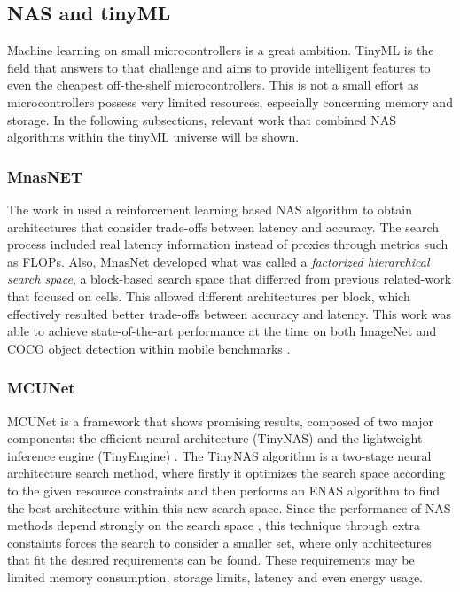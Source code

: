 \documentclass[10pt,        %
               a4paper,     %
               journal,     %
               ]{IEEEtran}
\begin{document}
\subsection{NAS and tinyML}
\label{nasml}
Machine learning on small microcontrollers is a great ambition. TinyML is the field that answers to that challenge
and aims to provide intelligent features to even the cheapest off-the-shelf microcontrollers. This is not a
small effort as microcontrollers possess very limited resources, especially concerning memory and storage. In the following
subsections, relevant work that combined NAS algorithms within the tinyML universe will be shown.

\subsubsection{\textbf{MnasNET}}
The work in \cite{tan2019mnasnet} used a reinforcement learning based NAS algorithm to obtain architectures that
consider trade-offs between latency and accuracy. The search process included real latency information instead of
proxies through metrics such as FLOPs. Also, MnasNet developed what was called a
\textit{factorized hierarchical search space}, a block-based search space that differred from previous related-work that
focused on cells. This allowed different architectures per block, which effectively resulted better trade-offs between
accuracy and latency.
This work was able
to achieve state-of-the-art performance at the time on both ImageNet and COCO object detection within
mobile benchmarks \cite{tan2019mnasnet}.

\subsubsection{\textbf{MCUNet}}
MCUNet is a framework that shows promising results, composed of
two major components: the efficient neural architecture (TinyNAS) and the lightweight inference engine (TinyEngine) \cite{lin2020mcunet}.
The TinyNAS algorithm is a two-stage neural architecture search method, where firstly it optimizes the search space according to the
given resource constraints and then performs an ENAS algorithm to find the best architecture within this new search space.
Since the performance of NAS methods depend strongly on the search space \cite{radosavovic2020designing}, this technique
through extra constaints forces the search to consider a smaller set, where only architectures that fit the desired requirements
can be found. These requirements may be limited memory consumption, storage limits, latency and even energy usage.
\end{document}
